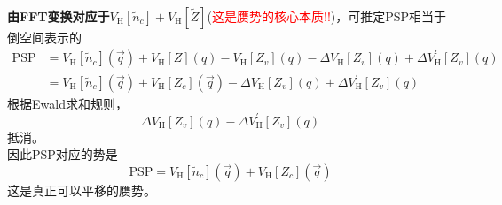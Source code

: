 \documentclass[10pt, oneside, a4paper]{article}      %
\newcommand{\upcite}[1]{\hspace{0ex}\textsuperscript{\cite{#1}}} %
\begin{document}
\textbf{由FFT变换对应于$V_{\mathrm{H}}[\tilde{n}_c]+V_{\mathrm{H}}[\tilde{Z}]$}(\textcolor{red}{这是赝势的核心本质!!})，可推定\textrm{PSP}相当于倒空间表示的
\begin{equation}
	\begin{aligned}
		\mathrm{PSP}&=V_{\mathrm{H}}[\tilde{n}_c](\vec q)+V_{\mathrm{H}}[Z](q)-V_{\mathrm{H}}[Z_v](q)-\Delta V_{\mathrm{H}}[Z_v](q)+\Delta V_{\mathrm{H}}^{\prime}[Z_v](q)\\
		&=V_{\mathrm{H}}[\tilde{n}_c](\vec q)+V_{\mathrm{H}}[Z_c](\vec q)-\Delta V_{\mathrm{H}}[Z_v](q)+\Delta V_{\mathrm{H}}^{\prime}[Z_v](q)
	\end{aligned}
	\label{eq:PSP}
\end{equation}
根据\textrm{Ewald}求和规则，
\begin{displaymath}
	\Delta V_{\mathrm{H}}[Z_v](q)-\Delta V_{\mathrm{H}}^{\prime}[Z_v](q)
\end{displaymath}
抵消。\\
因此\textrm{PSP}对应的势是
\begin{displaymath}
	\mathrm{PSP} = V_{\mathrm{H}}[\tilde{n}_c](\vec q)+V_{\mathrm{H}}[Z_c](\vec q)
\end{displaymath}
这是真正可以平移的赝势。




\end{document}
